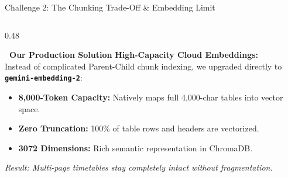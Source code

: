 \documentclass[11pt]{beamer}
\begin{document}
\begin{frame}{Challenge 2: The Chunking Trade-Off \& Embedding Limit}
\begin{columns}[T]
        \begin{column}{0.48\textwidth}
            \begin{block}{\textbf{\checkmark\ Our Production Solution}}
                \scriptsize
                \textbf{High-Capacity Cloud Embeddings:}\\[3pt]
                Instead of complicated Parent-Child chunk indexing, we upgraded directly to \textbf{\texttt{gemini-embedding-2}}:\\[4pt]
                \begin{itemize}\setlength\itemsep{2pt}
                    \item \textbf{8,000-Token Capacity:} Natively maps full 4,000-char tables into vector space.
                    \item \textbf{Zero Truncation:} 100\% of table rows and headers are vectorized.
                    \item \textbf{3072 Dimensions:} Rich semantic representation in ChromaDB.
                \end{itemize}
                \vspace{3pt}
                \textit{\tiny Result: Multi-page timetables stay completely intact without fragmentation.}
            \end{block}
        \end{column}
    \end{columns}
\end{frame}

\end{document}
